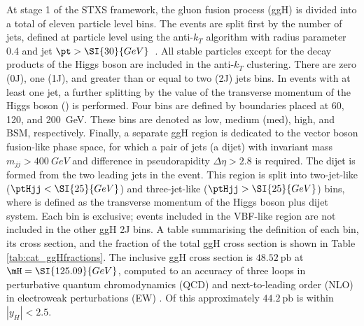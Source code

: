 At stage 1 of the STXS framework, 
the gluon fusion process (ggH) is divided into a total of eleven particle level bins.
The events are split first by the number of jets, 
defined at particle level using the anti-$k_T$ algorithm with radius parameter 0.4 
and jet $\pt > \SI{30}{GeV}$~\cite{AntiKt}.
All stable particles except for the decay products of the Higgs boson 
are included in the anti-$k_T$ clustering.
There are zero (0J), one (1J), and greater than or equal to two (2J) jets bins.
In events with at least one jet, a further splitting 
by the value of the transverse momentum of the Higgs boson (\ptH) is performed. 
Four bins are defined by boundaries placed at 60, 120, and \SI{200}{GeV}.
These bins are denoted as low, medium (med), high, and BSM, respectively.
Finally, a separate ggH region is dedicated to the vector boson fusion-like phase space, 
for which a pair of jets (a dijet) with invariant mass $m_{jj} > \SI{400}{GeV}$ 
and difference in pseudorapidity $\Delta\eta > 2.8$ is required.
The dijet is formed from the two leading jets in the event.
This region is split into two-jet-like ($\ptHjj < \SI{25}{GeV}$) 
and three-jet-like ($\ptHjj > \SI{25}{GeV}$) bins, 
where \ptHjj is defined as the transverse momentum of the Higgs boson plus dijet system.
Each bin is exclusive; events included in the VBF-like region are not included in the other ggH 2J bins.
A table summarising the definition of each bin, its cross section, and the fraction of the 
total ggH cross section is shown in Table \ref{tab:cat_ggHfractions}.
The inclusive ggH cross section is $48.52~\textrm{pb}$ at $\mH = \SI{125.09}{GeV}$, 
computed to an accuracy of three loops in perturbative quantum chromodynamics (QCD) 
and next-to-leading order (NLO) in electroweak perturbations (EW) 
\cite{YR4,Anastasiou2015,Anastasiou2016}.
Of this approximately $44.2~\textrm{pb}$ is within $|y_H| < 2.5$.

